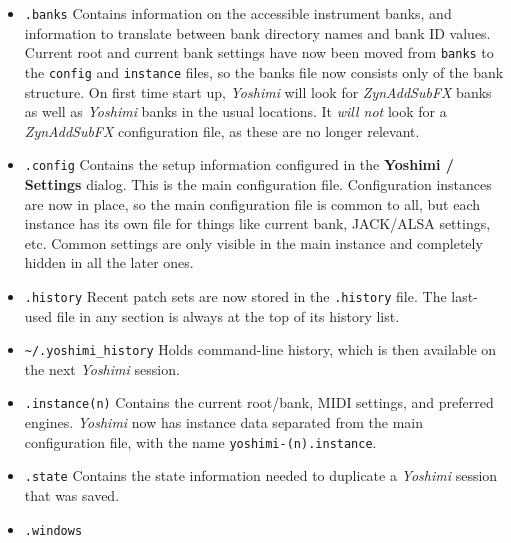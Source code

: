    \begin{itemize}
      \item \texttt{.banks}
         Contains information on the accessible instrument banks, and
         information to translate between bank directory names and bank ID
         values.
         Current root and current bank settings have now been moved from
         \texttt{banks} to the \texttt{config} and \texttt{instance}
         files, so the banks file now consists only of the bank structure.
         On first time start up, \textsl{Yoshimi} will look for
         \textsl{ZynAddSubFX} banks as well as \textsl{Yoshimi} banks in the
         usual locations. It \textsl{will not} look for a \textsl{ZynAddSubFX}
         configuration file, as these are no longer relevant.
      \item \texttt{.config}
         Contains the setup information configured in the
         \textbf{Yoshimi / Settings} dialog.
         This is the main configuration file.
         Configuration instances are now in place, so the main configuration
         file is common to all, but each instance has its own file for things
         like current bank, JACK/ALSA settings, etc.
         Common settings are only visible
         in the main instance and completely hidden in all the later ones.
      \item \texttt{.history}
         Recent patch sets are now stored in the \texttt{.history} file.
         The last-used file in any section is always at the top of its history
         list.
      \item \texttt{\textasciitilde/.yoshimi\_history}
         Holds command-line history, which is then available on the next
         \textsl{Yoshimi} session.
      \item \texttt{.instance(n)}
         Contains the current root/bank, MIDI settings, and preferred engines.
         \textsl{Yoshimi} now has instance data separated from the main
         configuration file, with the name \texttt{yoshimi-(n).instance}.
      \item \texttt{.state}
         Contains the state information needed to
         duplicate a \textsl{Yoshimi} session that was saved.
      \item \texttt{.windows}

\end{itemize}
